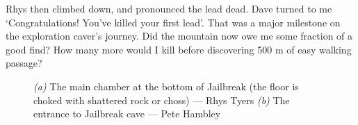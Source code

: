 	Rhys then climbed down, and pronounced the lead dead. Dave turned to me `Congratulations! You've killed your first lead'. That was a major milestone on the exploration caver's journey. Did the mountain now owe me some fraction of a good find? How many more would I kill before discovering 500 m of easy walking passage?

	\begin{figure}[t!]
	\checkoddpage \ifoddpage \forcerectofloat \else \forceversofloat \fi
		\centering
		\begin{subfigure}[t]{0.517\textwidth}
			\centering
			\caption{}
			\label{Inside Jailbreak}
		\end{subfigure}
	\hfill
		\begin{subfigure}[t]{0.463\textwidth}
			\centering
			\caption{}\label{Entrance to Jailbreak}
		\end{subfigure}
		\caption{ \emph{(a)} The main chamber at the bottom of Jailbreak (the floor is choked with shattered rock or choss) --- Rhys Tyers \emph{(b)} The entrance to Jailbreak cave --- Pete Hambley}
	\end{figure}


